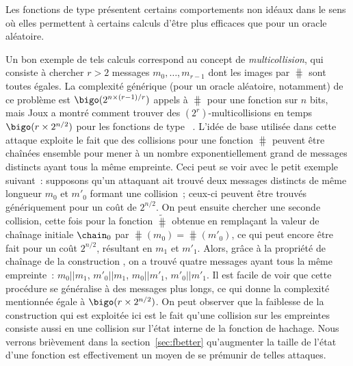 Les fonctions de type \merkdam présentent certains comportements non idéaux dans le sens où elles permettent à certains calculs
d'être plus efficaces que pour un oracle aléatoire.

Un bon exemple de tels calculs correspond au concept de 
\emph{multicollision}, qui consiste à chercher $r > 2$ messages $m_{0},\ldots,m_{r-1}$ dont les images par $\hash$
sont toutes égales.
La complexité générique (pour un oracle aléatoire, notamment) de ce problème est
$\bigo(2^{n\times (r-1)/r})$ appels à $\hash$ pour une fonction sur $n$ bits, mais
Joux a montré comment trouver
des $(2^r)$-multicollisions en temps $\bigo(r\times 2^{n/2})$ pour les fonctions de type \merkdam~\cite{DBLP:conf/crypto/Joux04}.
L'idée de base utilisée dans cette attaque exploite le fait que des collisions pour une fonction \merkdam $\hash$ peuvent être chaînées
ensemble pour mener à un nombre exponentiellement grand de messages distincts ayant tous la même empreinte.
Ceci peut se voir avec le petit exemple suivant~: supposons qu'un attaquant ait trouvé deux messages distincts
de même longueur $m_0$ et $m'_0$ formant une collision~; ceux-ci peuvent être trouvés génériquement
pour un coût de
$2^{n/2}$. On peut ensuite chercher une seconde collision, cette fois pour la fonction $\widetilde \hash$ obtenue en remplaçant la valeur de chaînage initiale
$\chain_0$ par $\hash(m_0) = \hash(m'_0)$, ce qui peut encore être fait pour un coût $2^{n/2}$, résultant en $m_1$ et $m'_1$.
Alors, grâce à la propriété de chaînage de la construction \merkdam, on a trouvé quatre messages ayant tous la même empreinte~:
$m_0||m_1$, $m'_0||m_1$, $m_0||m'_1$, $m'_0||m'_1$. 
Il est facile de voir que cette procédure se généralise à des messages plus longs, ce qui donne la complexité mentionnée égale à
$\bigo(r \times 2^{n/2})$.
On peut observer que la faiblesse de la construction qui est exploitée ici est le fait qu'une collision
sur les empreintes consiste aussi en une collision sur l'état interne de la fonction de hachage.
Nous verrons brièvement dans la section~\ref{sec:fbetter} qu'augmenter la taille de l'état d'une fonction
est effectivement un moyen de se prémunir de telles attaques.

